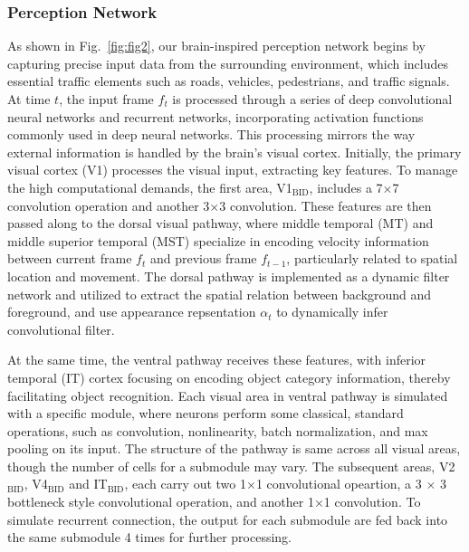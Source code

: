 \subsubsection{Perception Network}
\hspace{1pc}As shown in Fig.~\ref{fig:fig2}, our brain-inspired perception network begins by capturing precise input data from the surrounding environment, which includes essential traffic elements such as roads, vehicles, pedestrians, and traffic signals. 
At time $t$, the input frame $f_t$ is processed through a series of deep convolutional neural networks and recurrent networks, incorporating activation functions commonly used in deep neural networks. 
This processing mirrors the way external information is handled by the brain's visual cortex. 
Initially, the primary visual cortex (V1) processes the visual input, extracting key features. 
To manage the high computational demands, the first area, V1$_\text{BID}$, includes a 7$\times$7 convolution operation and another 3$\times$3 convolution. 
These features are then passed along to the dorsal visual pathway, where middle temporal (MT) and middle superior temporal (MST) specialize in encoding velocity information between current frame $ f_t $ and previous frame $ f_{t-1} $, particularly related to spatial location and movement\cite{wang2022btn}. 
The dorsal pathway is implemented as a dynamic filter network\cite{jia2016dynamic} and utilized to extract the spatial relation between background and foreground, 
and use appearance repsentation $ \alpha_t $ to dynamically infer convolutional filter.


At the same time, the ventral pathway receives these features, with inferior temporal (IT) cortex focusing on encoding object category information, thereby facilitating object recognition.
Each visual area in ventral pathway is simulated with a specific module, where neurons perform some classical, standard operations, such as convolution, nonlinearity, batch normalization, and max pooling on its input. 
The structure of the pathway is same across all visual areas, though the number of cells for a submodule may vary.
The subsequent areas, V2$_\text{BID}$, V4$_\text{BID}$ and IT$_\text{BID}$, each carry out two 1$\times$1 convolutional opeartion, a 3 $ \times $ 3 bottleneck style convolutional operation, and another 1$\times$1 convolution. 
To simulate recurrent connection, the output for each submodule are fed back into the same submodule 4 times for further processing.


